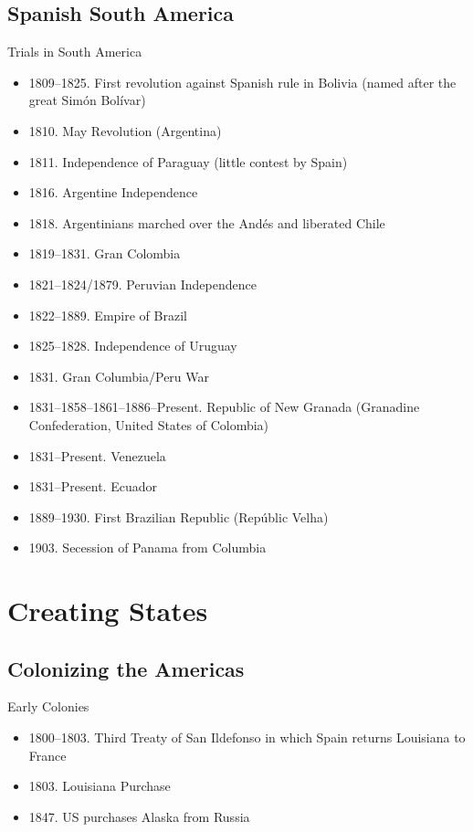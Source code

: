 \subsection{Spanish South America}
\begin{frame}{Trials in South America}
	\begin{itemize}
		\item<3-17>1809--1825. First revolution against Spanish rule in Bolivia (named after the great Sim{\'o}n Bol{\'i}var)
		\item<4-17>1810. May Revolution (Argentina)
		\item<5-17>1811. Independence of Paraguay (little contest by Spain)
		\item<6-17>1816. Argentine Independence
		\item<7-17>1818. Argentinians marched over the And{\'e}s and liberated Chile
		\item<8-17>1819--1831. Gran Colombia
		\item<9-17>1821--1824/1879. Peruvian Independence
		\item<10-17>1822--1889. Empire of Brazil
		\item<11-17>1825--1828. Independence of Uruguay
		\item<12-17>1831. Gran Columbia/Peru War
		\item<13-17>1831--1858--1861--1886--Present. Republic of New Granada (Granadine Confederation, United States of Colombia)
		\item<14-17>1831--Present. Venezuela
		\item<15-17>1831--Present. Ecuador
		\item<16-17>1889--1930. First Brazilian Republic (Rep{\'u}blic Velha)
		\item<17>1903. Secession of Panama from Columbia
	\end{itemize}
\end{frame}

\section{Creating States}
\subsection{Colonizing the Americas}
\begin{frame}{Early Colonies}
	\begin{itemize}
		\item<14->1800--1803. Third Treaty of San Ildefonso in which Spain returns Louisiana to France
		\item<15->1803. Louisiana Purchase
		\item<1->1847. US purchases Alaska from Russia
	\end{itemize}
\end{frame}

